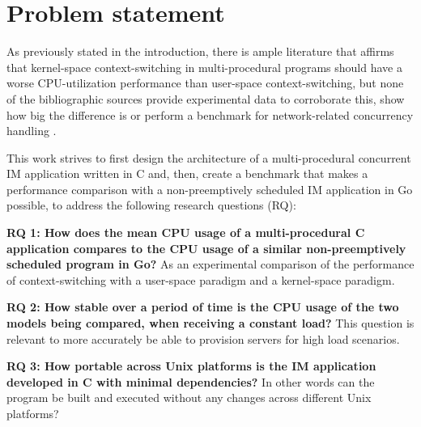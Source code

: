 \section{Problem statement}
As previously stated in the introduction, there is ample literature that affirms that kernel-space context-switching in multi-procedural programs should have a worse CPU-utilization performance than user-space context-switching, but none of the bibliographic sources provide experimental data to corroborate this, show how big the difference is or perform a benchmark for network-related concurrency handling \cite{2003Events}\cite{2005Threads}\cite{2013ContextSwitching}\cite{Cox-Buday2017}\cite{Kerrisk2010}.

This work strives to first design the architecture of a multi-procedural concurrent IM application written in C and, then, create a benchmark that makes a performance comparison with a non-preemptively scheduled IM application in Go possible, to address the following research questions (RQ):

\textbf{RQ 1: How does the mean CPU usage of a multi-procedural C application compares to the CPU usage of a similar non-preemptively scheduled program in Go?} As an experimental comparison of the performance of context-switching with a user-space paradigm and a kernel-space paradigm.

\textbf{RQ 2: How stable over a period of time is the CPU usage of the two models being compared, when receiving a constant load?} This question is relevant to more accurately be able to provision servers for high load scenarios.

\textbf{RQ 3: How portable across Unix platforms is the IM application developed in C with minimal dependencies?} In other words can the program be built and executed without any changes across different Unix platforms?




